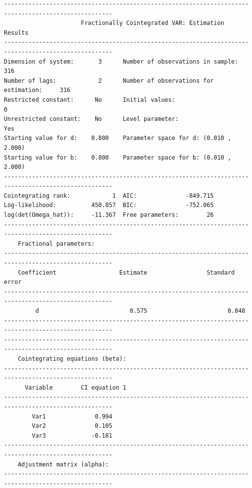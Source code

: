 \documentclass[10pt]{article}
\begin{document}
\begin{verbatim}
-----------------------------------------------------------------------------------------------------
                      Fractionally Cointegrated VAR: Estimation Results                              
-----------------------------------------------------------------------------------------------------
Dimension of system:       3      Number of observations in sample:          316 
Number of lags:            2      Number of observations for estimation:     316 
Restricted constant:      No      Initial values:                              0
Unrestricted constant:    No      Level parameter:                           Yes
Starting value for d:    0.800    Parameter space for d: (0.010 , 2.000) 
Starting value for b:    0.800    Parameter space for b: (0.010 , 2.000) 
-----------------------------------------------------------------------------------------------------
Cointegrating rank:            1  AIC:              -849.715 
Log-likelihood:          450.857  BIC:              -752.065 
log(det(Omega_hat)):     -11.367  Free parameters:        26 
-----------------------------------------------------------------------------------------------------
    Fractional parameters:                                                                             
-----------------------------------------------------------------------------------------------------
    Coefficient              	 Estimate              	  Standard error 
-----------------------------------------------------------------------------------------------------
         d                   	    0.575              	        0.048                
-----------------------------------------------------------------------------------------------------
-----------------------------------------------------------------------------------------------------
    Cointegrating equations (beta):                                                                  
-----------------------------------------------------------------------------------------------------
      Variable        CI equation 1  
-----------------------------------------------------------------------------------------------------
        Var1              0.994     
        Var2              0.105     
        Var3             -0.181     
-----------------------------------------------------------------------------------------------------
    Adjustment matrix (alpha):                                                                         
-----------------------------------------------------------------------------------------------------

\end{verbatim}
\end{document}

